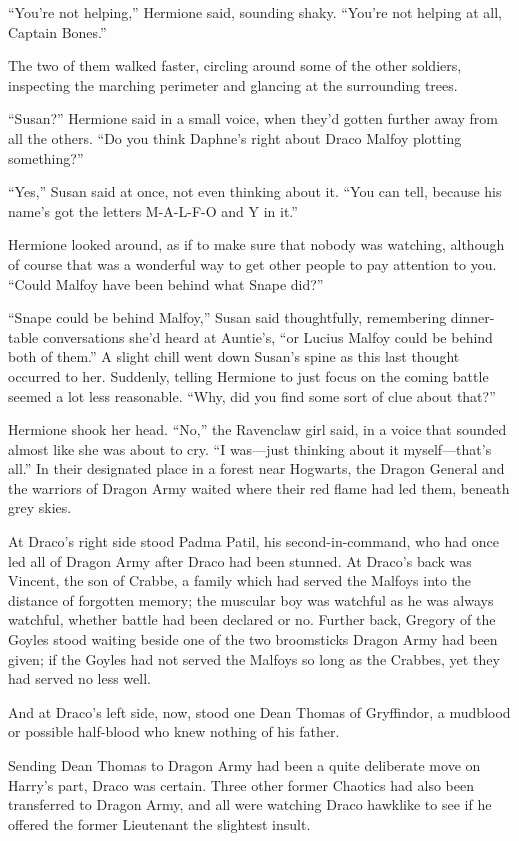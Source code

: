 “You’re not helping,” Hermione said, sounding shaky. “You’re not
helping at all, Captain Bones.”

The two of them walked faster, circling around some of the other
soldiers, inspecting the marching perimeter and glancing at the
surrounding trees.

“Susan?” Hermione said in a small voice, when they’d gotten
further away from all the others. “Do you think Daphne’s right
about Draco Malfoy plotting something?”

“Yes,” Susan said at once, not even thinking about it. “You can
tell, because his name’s got the letters M-A-L-F-O and Y in
it.”

Hermione looked around, as if to make sure that nobody was
watching, although of course that was a wonderful way to get other
people to pay attention to you. “Could Malfoy have been behind what
Snape did?”

“Snape could be behind Malfoy,” Susan said thoughtfully,
remembering dinner-table conversations she’d heard at Auntie’s, “or
Lucius Malfoy could be behind both of them.” A slight chill went
down Susan’s spine as this last thought occurred to her. Suddenly,
telling Hermione to just focus on the coming battle seemed a lot
less reasonable. “Why, did you find some sort of clue about
that?”

Hermione shook her head. “No,” the Ravenclaw girl said, in a
voice that sounded almost like she was about to cry. “I was—just
thinking about it myself—that’s all.”
\sbreak
In their designated place in a forest near Hogwarts, the Dragon
General and the warriors of Dragon Army waited where their red
flame had led them, beneath grey skies.

At Draco’s right side stood Padma Patil, his second-in-command,
who had once led all of Dragon Army after Draco had been stunned.
At Draco’s back was Vincent, the son of Crabbe, a family which had
served the Malfoys into the distance of forgotten memory; the
muscular boy was watchful as he was always watchful, whether battle
had been declared or no. Further back, Gregory of the Goyles stood
waiting beside one of the two broomsticks Dragon Army had been
given; if the Goyles had not served the Malfoys so long as the
Crabbes, yet they had served no less well.

And at Draco’s left side, now, stood one Dean Thomas of
Gryffindor, a mudblood or possible half-blood who knew nothing of
his father.

Sending Dean Thomas to Dragon Army had been a quite deliberate
move on Harry’s part, Draco was certain. Three other former
Chaotics had also been transferred to Dragon Army, and all were
watching Draco hawklike to see if he offered the former Lieutenant
the slightest insult.

